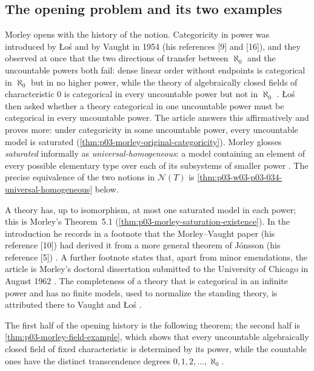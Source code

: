 \subsection{The opening problem and its two examples}
\label{sec:p03-w03-p03-034-opening}

Morley opens with the history of the notion. Categoricity in power was
introduced by Łoś and by Vaught in 1954 (his references [9] and [16]), and
they observed at once that the two directions of transfer between
\(\aleph_0\) and the uncountable powers both fail: dense linear order
without endpoints is categorical in \(\aleph_0\) but in no higher power,
while the theory of algebraically closed fields of characteristic \(0\) is
categorical in every uncountable power but not in \(\aleph_0\)
\cite[p.~514]{Morley1965}. Łoś then asked whether a theory categorical in
one uncountable power must be categorical in every uncountable power. The
article answers this affirmatively and proves more: under categoricity in
some uncountable power, every uncountable model is saturated
(\cref{thm:p03-morley-original-categoricity}). Morley glosses
\emph{saturated} informally as \emph{universal-homogeneous}: a model
containing an element of every possible elementary type over each of its
subsystems of smaller power \cite[p.~514]{Morley1965}. The precise
equivalence of the two notions in \(\mathcal N(T)\) is
\cref{thm:p03-w03-p03-034-universal-homogeneous} below.

A theory has, up to isomorphism, at most one saturated model in each power;
this is Morley's Theorem~5.1 (\cref{thm:p03-morley-saturation-existence}).
In the introduction he records in a footnote that the Morley--Vaught paper
(his reference [10]) had derived it from a more general theorem of Jónsson
(his reference [5]) \cite[p.~514, n.~2]{Morley1965}. A further footnote
states that, apart from minor emendations, the article is Morley's
doctoral dissertation submitted to the University of Chicago in August
1962 \cite[p.~514, n.~1]{Morley1965}. The completeness of a theory that is
categorical in an infinite power and has no finite models, used to
normalize the standing theory, is attributed there to Vaught and Łoś
\cite[p.~516]{Morley1965}.

The first half of the opening history is the following theorem; the second
half is \cref{thm:p03-morley-field-example}, which shows that every
uncountable algebraically closed field of fixed characteristic is
determined by its power, while the countable ones have the distinct
transcendence degrees \(0,1,2,\ldots,\aleph_0\).


